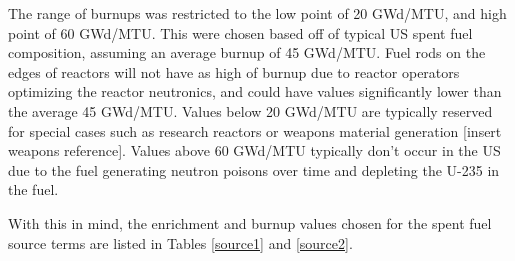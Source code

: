 
The range of burnups was restricted to the low point of 20 GWd/MTU, and high point of 60 GWd/MTU. This were chosen based off of typical US spent fuel composition, assuming an average burnup of 45 GWd/MTU. Fuel rods on the edges of reactors will not have as high of burnup due to reactor operators optimizing the reactor neutronics, and could have values significantly lower than the average 45 GWd/MTU. Values below 20 GWd/MTU are typically reserved for special cases such as research reactors or weapons material generation [insert weapons reference]. Values above 60 GWd/MTU typically don't occur in the US due to the fuel generating neutron poisons over time and depleting the U-235 in the fuel. 

With this in mind, the enrichment and burnup values chosen for the spent fuel source terms are listed in Tables \ref{source1} and \ref{source2}. 

